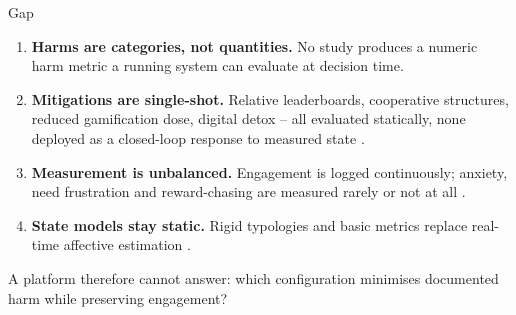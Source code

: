 \documentclass[10pt]{beamer}
\begin{document}
\begin{frame}{Gap}
\begin{enumerate}
    \item \textbf{Harms are categories, not quantities.} No study produces a numeric harm metric
    a running system can evaluate at decision time.
    \item \textbf{Mitigations are single-shot.} Relative leaderboards, cooperative structures,
    reduced gamification dose, digital detox -- all evaluated statically, none deployed as a
    closed-loop response to measured state \cite{nugroho2025negative,edwards2022anxiety,gao2024sdt,gul2026brainrot}.
    \item \textbf{Measurement is unbalanced.} Engagement is logged continuously; anxiety, need
    frustration and reward-chasing are measured rarely or not at all \cite{edwards2022anxiety}.
    \item \textbf{State models stay static.} Rigid typologies and basic metrics replace
    real-time affective estimation \cite{shabadurai2025reinforcement,zourmpakis2023adaptive,naseer2025game}.
\end{enumerate}
\vspace{0.1cm}
\begin{keybox}
A platform therefore cannot answer: which configuration minimises documented harm while
preserving engagement?
\end{keybox}
\end{frame}
\end{document}
